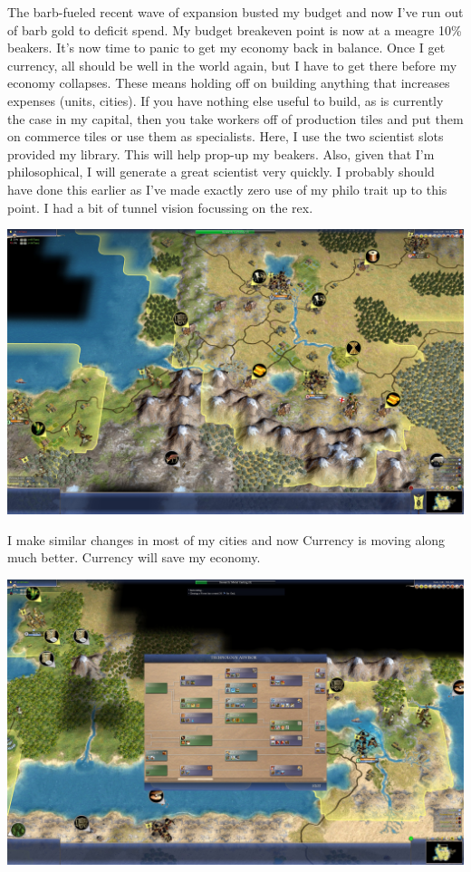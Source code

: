 \documentclass[10pt]{article}
\begin{document}
The barb-fueled recent wave of expansion busted my budget and now I've run out of barb gold to deficit spend. My
budget breakeven point is now at a meagre 10\% beakers. It's now time to panic to get my economy back in balance. Once
I get currency, all should be well in the world again, but I have to get there before my economy collapses. These means
holding off on building anything that increases expenses (units, cities). If you have nothing else useful to build, as is
currently the case in my capital, then you take workers off of production tiles and put them on commerce tiles or use
them as specialists. Here, I use the two scientist slots provided my library. This will help prop-up my beakers. Also,
given that I'm philosophical, I will generate a great scientist very quickly. I probably should have done this earlier as
I've made exactly zero use of my philo trait up to this point. I had a bit of tunnel vision focussing on the rex.

\includegraphics[width=1.0\textwidth]{116}

I make similar changes in most of my cities and now Currency is moving along much better. Currency will save my
economy.

\includegraphics[width=1.0\textwidth]{117}
\end{document}
